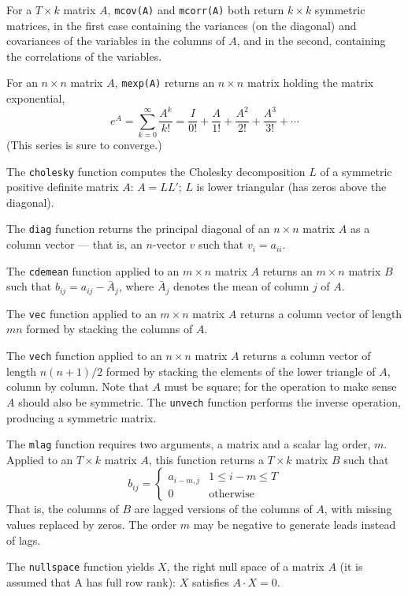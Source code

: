 For a $T \times k$ matrix $A$, \texttt{mcov(A)} and \texttt{mcorr(A)}
both return $k \times k$ symmetric matrices, in the first case
containing the variances (on the diagonal) and covariances of the
variables in the columns of $A$, and in the second, containing the
correlations of the variables.

For an $n \times n$ matrix $A$, \texttt{mexp(A)} returns an $n \times
n$ matrix holding the matrix exponential,
\[
e^A = \sum_{k=0}^{\infty} \frac{A^k}{k!} = \frac{I}{0!} + \frac{A}{1!}
 + \frac{A^2}{2!} + \frac{A^3}{3!} + \cdots
\]
(This series is sure to converge.)

The \texttt{cholesky} function computes the Cholesky decomposition $L$
of a symmetric positive definite matrix $A$: $A = LL'$; $L$ is lower
triangular (has zeros above the diagonal).  

The \texttt{diag} function returns the principal diagonal of an
$n\times n$ matrix $A$ as a column vector --- that is, an
$n$-vector $v$ such that $v_i = a_{ii}$.

The \texttt{cdemean} function applied to an $m \times n$ matrix $A$
returns an $m \times n$ matrix $B$ such that $b_{ij} = a_{ij} -
\bar{A}_j$, where $\bar{A}_j$ denotes the mean of column $j$ of $A$.  

The \texttt{vec} function applied to an $m \times n$ matrix $A$
returns a column vector of length $mn$ formed by stacking the columns
of $A$.  

The \texttt{vech} function applied to an $n \times n$ matrix $A$
returns a column vector of length $n(n+1)/2$ formed by stacking the
elements of the lower triangle of $A$, column by column.  Note that
$A$ must be square; for the operation to make sense $A$ should also
be symmetric.  The \texttt{unvech} function performs the inverse
operation, producing a symmetric matrix.

The \texttt{mlag} function requires two arguments, a matrix and a
scalar lag order, $m$.  Applied to an $T \times k$ matrix $A$, this
function returns a $T \times k$ matrix $B$ such that
%
\[
  b_{ij} = \left\{ 
    \begin{array}{ll} 
      a_{i-m,j} & 1 \leq i - m \leq T \\ 
      0 & \mbox{otherwise}
    \end{array}
    \right.
\]
%
That is, the columns of $B$ are lagged versions of the columns of $A$,
with missing values replaced by zeros.  The order $m$ may be negative
to generate leads instead of lags.

The \texttt{nullspace} function yields $X$, the right null space of a
matrix $A$ (it is assumed that A has full row rank): $X$ satisfies $A
\cdot X = 0$.

